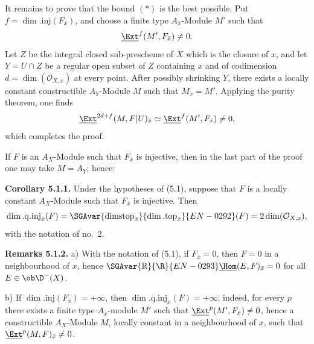 It remains to prove that the bound $(*)$ is the best possible. Put $f=\dim.\mathrm{inj}(F_{\bar{x}})$, and choose a finite type $A_{\bar{x}}$-Module $M'$ such that
\[
        \underline{\Ext}^f(M',F_{\bar{x}})\neq0.
\]
Let $Z$ be the integral closed sub-prescheme of $X$ which is the closure of $x$, and let $Y=U\cap Z$ be a regular open subset of $Z$ containing $x$ and of codimension $d=\dim(\mathcal{O}_{X,x})$ at every point. After possibly shrinking $Y$, there exists a locally constant constructible $A_Y$-Module $M$ such that $M_{\bar{x}}=M'$. Applying the purity theorem, one finds
\[
        \underline{\Ext}^{2d+f}(M,F|U)_{\bar{x}}\simeq \underline{\Ext}^f(M',F_{\bar{x}})\neq0,
\]
which completes the proof.

If $F$ is an $A_X$-Module such that $F_{\bar{x}}$ is injective, then in the last part of the proof one may take $M=A_Y$; hence:

\textbf{Corollary 5.1.1.} Under the hypotheses of (5.1), suppose that $F$ is a locally constant $A_X$-Module such that $F_{\bar{x}}$ is injective. Then
\[
        \dim.\mathrm{q.inj}_{\bar{x}}(F)=\SGAvar{\operatorname{dimstop}_{\bar{x}}}{\dim.\mathrm{top}_{\bar{x}}}{EN-0292}(F)=2\dim(\mathcal{O}_{X,x}),
\]
with the notation of no.~2.

\textbf{Remarks 5.1.2.} a) With the notation of (5.1), if $F_{\bar{x}}=0$, then $F=0$ in a neighbourhood of $x$, hence $\SGAvar{\mathbb{R}}{\R}{EN-0293}\underline{\Hom}(E,F)_{\bar{x}}=0$ for all $E\in\ob\D^{-}(X)$.

b) If $\dim.\mathrm{inj}(F_{\bar{x}})=+\infty$, then $\dim.\mathrm{q.inj}_{\bar{x}}(F)=+\infty$; indeed, for every $p$ there exists a finite type $A_{\bar{x}}$-module $M'$ such that $\underline{\Ext}^p(M',F_{\bar{x}})\neq0$, hence a constructible $A_X$-Module $M$, locally constant in a neighbourhood of $x$, such that $\underline{\Ext}^p(M,F)_{\bar{x}}\neq0$.


